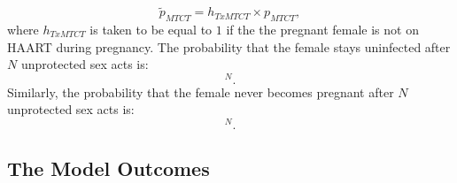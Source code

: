 \documentclass[11pt]{nih_mod}
\begin{document}
\begin{equation}
	\tilde{p}_{MTCT} = h_{TxMTCT}\times p_{MTCT}, 
\end{equation}
where $h_{TxMTCT}$ is taken to be equal to $1$ if the the pregnant female is not on HAART during pregnancy. The probability that the female stays uninfected after $N$ unprotected sex acts is:
\begin{equation}
	[1-\tilde{\alpha}]^N.
\end{equation}
Similarly, the probability that the female never becomes pregnant after $N$ unprotected sex acts is: 
\begin{equation}
	[1-p_c(a)]^N.
\end{equation} 

\subsection{The Model Outcomes}
\end{document}
